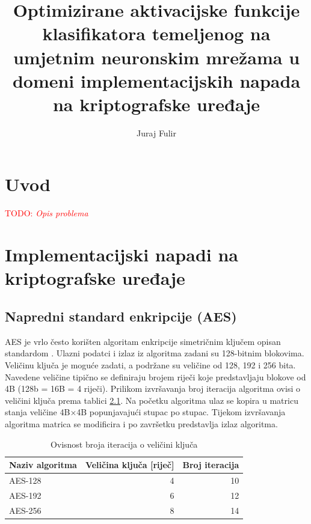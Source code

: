 \documentclass[times, utf8, numeric, diplomski]{fer}
\def\TODO#1{\noindent\textcolor{red}{TODO: \textit{#1}}\newline}
\def\todo#1{\TODO{#1}}
\begin{document}

\title{Optimizirane aktivacijske funkcije klasifikatora temeljenog na umjetnim neuronskim mrežama u domeni implementacijskih napada na kriptografske uređaje}

\author{Juraj Fulir}

\maketitle

\izvornik


\tableofcontents

\chapter{Uvod}
\todo{Opis problema}

\chapter{Implementacijski napadi na kriptografske uređaje}

\section{Napredni standard enkripcije (AES)}

AES je vrlo često korišten algoritam enkripcije simetričnim ključem opisan standardom \citet{aes_standard}. Ulazni podatci i izlaz iz algoritma zadani su 128-bitnim blokovima. Veličinu ključa je moguće zadati, a podržane su veličine od 128, 192 i 256 bita. Navedene veličine tipično se definiraju brojem riječi koje predstavljaju blokove od 4B (128b = 16B = 4 riječi). Prilikom izvršavanja broj iteracija algoritma ovisi o veličini ključa prema tablici \ref{tab:aes_rounds}. Na početku algoritma ulaz se kopira u matricu stanja veličine 4B$\times$4B popunjavajući stupac po stupac. Tijekom izvršavanja algoritma matrica se modificira i po završetku predstavlja izlaz algoritma.

\begin{table}[H]
\begin{tabular}{lrr}
Naziv algoritma & Veličina ključa [riječ] & Broj iteracija \\
\hline
AES-128 & 4 & 10 \\
AES-192 & 6 & 12 \\
AES-256 & 8 & 14
\end{tabular}
\centering
\caption{Ovisnost broja iteracija o veličini ključa}
\label{tab:aes_rounds}
\end{table}
\end{document}
